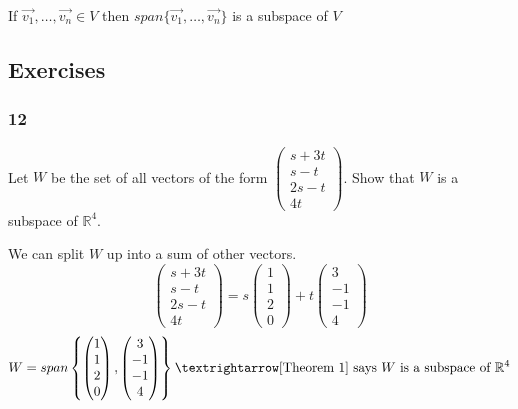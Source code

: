     \begin{theorem} \label{Theorem 1}
      If $ \vec{v_1}, \dots, \vec{v_n} ∈ V$ then $ span\{\vec{v_1}, \dots, \vec{v_n}\} $ is a subspace of $ V $ 
    \end{theorem}

  \subsection*{Exercises}
    \subsubsection*{12}

    Let $ W $ be the set of all vectors of the form $   \begin{pmatrix}
         s + 3t   \\ 
         s - t \\ 
         2s - t \\
         4t
      \end{pmatrix} $. 
    Show that $ W $ is a subspace of $ \mathbb R^{4} $. \newline \newline 

    We can split $ W $ up into a sum of other vectors. 
    $$
        \begin{pmatrix}
          s + 3t   \\ 
          s - t \\ 
          2s - t \\
          4t
        \end{pmatrix} = 
     s   \begin{pmatrix}
          1  \\ 
          1  \\ 
          2  \\
          0  
       \end{pmatrix} + 
    t   \begin{pmatrix}
         3  \\ 
         -1  \\ 
         -1  \\
         4  
      \end{pmatrix}
    $$
    \[
    W = span \left\{
      \begin{pmatrix}
        1  \\ 
        1  \\ 
        2  \\
        0  
     \end{pmatrix} , 
     \begin{pmatrix}
       3  \\ 
       -1  \\ 
       -1  \\
       4  
    \end{pmatrix}
    \right\}_{}^{} → 
    \text{\cref{Theorem 1} says $ W $ is a subspace of $ \mathbb R^{4} $}
    \]

